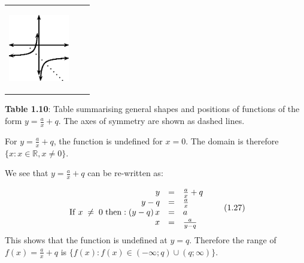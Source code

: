 \begin{center}
\begin{xtabular*}{\mytablewidth}[t]{|p{10\mystarwidth}|p{10\mystarwidth}|p{10\mystarwidth}|}
\begin{center}
\label{m39341*id246993!!!underscore!!!media}\label{m39341*id246993!!!underscore!!!printimage}\includegraphics[width=100px]{col11306.imgs/m39341_MG10C11_025.png} %
\vspace{2pt}
\vspace{.1in}
\end{center}    
\tabularnewline{}
\end{xtabular*}
\end{center}
\begin{center}{\small\bfseries Table 1.10}: Table summarising general shapes and positions of functions of the form $y=\frac{a}{x}+q$. The axes of symmetry are shown as dashed lines.\end{center}
\par
{}  
\label{m39341*uid152}
\nopagebreak
\label{m39341*id247010}For $y=\frac{a}{x}+q$, the function is undefined for $x=0$. The domain is therefore $\{x:x\in \mathbb{R},x\ne 0\}$.\par 
\label{m39341*id247087}We see that $y=\frac{a}{x}+q$ can be re-written as:\par 
\label{m39341*id247116}\nopagebreak\noindent{}
\begin{equation}
\begin{array}{ccc}\hfill y& =& \frac{a}{x}+q\hfill \\ \hfill y-q& =& \frac{a}{x}\hfill \\ \hfill \mathrm{If}\phantom{\rule{3pt}{0ex}}x\; \ne \;  0 \phantom{\rule{3pt}{0ex}}\mathrm{then}:\left(y-q\right)x& =& a\hfill \\ \hfill x& =& \frac{a}{y-q}\hfill \end{array}\tag{1.27}
\end{equation}
\label{m39341*id247260}This shows that the function is undefined at $y=q$. Therefore the range of $f\left(x\right)=\frac{a}{x}+q$ is $\{f\left(x\right):f\left(x\right)\in \left(-\infty ;q\right)\cup \left(q;\infty \right)\}$.\par 
